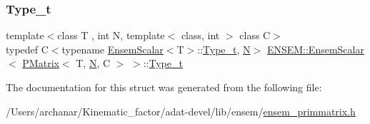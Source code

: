 \mbox{\label{structENSEM_1_1EnsemScalar_3_01PMatrix_3_01T_00_01N_00_01C_01_4_01_4_a63cd7ffca7507ffb61823092f6d0f8db}} 
\subsubsection{\texorpdfstring{Type\_t}{Type\_t}\hspace{0.1cm}{\footnotesize\ttfamily [3/3]}}
{\footnotesize\ttfamily template$<$class T , int N, template$<$ class, int $>$ class C$>$ \\
typedef C$<$typename \mbox{\hyperlink{structENSEM_1_1EnsemScalar}{Ensem\+Scalar}}$<$T$>$\+::\mbox{\hyperlink{structENSEM_1_1EnsemScalar_3_01PMatrix_3_01T_00_01N_00_01C_01_4_01_4_a63cd7ffca7507ffb61823092f6d0f8db}{Type\+\_\+t}}, \mbox{\hyperlink{adat__devel_2lib_2hadron_2operator__name__util_8cc_a7722c8ecbb62d99aee7ce68b1752f337}{N}}$>$ \mbox{\hyperlink{structENSEM_1_1EnsemScalar}{E\+N\+S\+E\+M\+::\+Ensem\+Scalar}}$<$ \mbox{\hyperlink{classENSEM_1_1PMatrix}{P\+Matrix}}$<$ T, \mbox{\hyperlink{adat__devel_2lib_2hadron_2operator__name__util_8cc_a7722c8ecbb62d99aee7ce68b1752f337}{N}}, C $>$ $>$\+::\mbox{\hyperlink{structENSEM_1_1EnsemScalar_3_01PMatrix_3_01T_00_01N_00_01C_01_4_01_4_a63cd7ffca7507ffb61823092f6d0f8db}{Type\+\_\+t}}}



The documentation for this struct was generated from the following file\+:\begin{DoxyCompactItemize}
\item 
/\+Users/archanar/\+Kinematic\+\_\+factor/adat-\/devel/lib/ensem/\mbox{\hyperlink{adat-devel_2lib_2ensem_2ensem__primmatrix_8h}{ensem\+\_\+primmatrix.\+h}}\end{DoxyCompactItemize}
